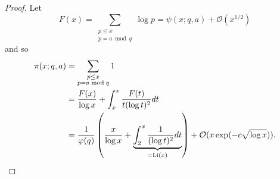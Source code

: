 \documentclass{article}
\newcommand{\1}{\mathbbm{1}}
\newcommand{\bigO}{\mathcal{O}}
\DeclareMathOperator\Li{Li}
\begin{document}
\begin{proof}
  Let
  \begin{equation*}
    F(x) = \sum_{\substack{p \leq x \\ p = a \bmod q}} \log p = \psi(x; q, a) + \bigO(x^{1/2})
  \end{equation*}
  and so
  \begin{align*}
    \pi(x; q, a)
    &= \sum_{\substack{p \leq x \\ p = a \bmod q}} 1 \\
    &= \frac{F(x)}{\log x} + \int_x^x \frac{F(t)}{t (\log t)^2} dt \\
    &= \frac{1}{\varphi(q)} \left(\frac{x}{\log x} + \underbrace{\int_2^x \frac{1}{(\log t)^2} dt}_{= \Li(x)}\right) + \bigO(x \exp(-c \sqrt{\log x})). \qedhere
  \end{align*}
\end{proof}
\end{document}
